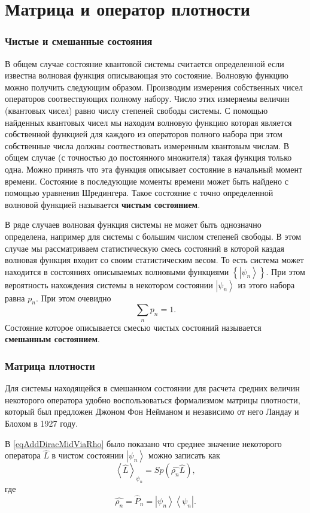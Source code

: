 \chapter{Матрица и оператор плотности}
\label{AddState}

\subsection{Чистые и смешанные состояния}
В общем случае состояние квантовой системы считается определенной если
известна волновая функция описывающая это состояние. Волновую функцию
можно получить следующим образом. Производим измерения собственных
чисел операторов соотвествующих полному набору. Число этих измеряемы
величин (квантовых чисел) равно числу степеней свободы системы. С
помощью найденных квантовых чисел мы находим волновую функцию которая
является собственной функцией для каждого из операторов полного набора
при этом собственные числа должны соотвествовать измеренным квантовым
числам. В общем случае (с точностью до постоянного множителя) такая
функция только одна. Можно принять что эта функция описывает состояние
в начальный момент времени. Состояние в последующие моменты времени
может быть найдено с помощью уравнения Шредингера. Такое состояние с
точно определенной волновой функцией называется 
\textbf{чистым состоянием}.

В ряде случаев волновая функция системы не может быть однозначно
определена, например для системы с большим числом степеней свободы. В
этом случае мы рассматриваем статистическую смесь состояний в которой
каздая волновая функция входит со своим статистическим весом. То есть
система может находится в состояниях описываемых волновыми функциями
\(\left\{\left|\psi_n\right>\right\}\). При этом вероятность
нахождения системы в некотором состоянии \(\left|\psi_n\right>\) из
этого набора равна \(p_n\). При этом очевидно 
\[
\sum_n p_n = 1.
\]
Состояние которое описывается смесью чистых состояний называется
\textbf{смешанным состоянием}.

\subsection{Матрица плотности}
Для системы находящейся в смешанном состоянии для расчета средних
величин некоторого оператора удобно воспользоваться формализмом
матрицы плотности, который  был предложен Джоном Фон Нейманом и
независимо от него Ландау и Блохом в 1927 году.

В \ref{eqAddDiracMidViaRho} было показано что среднее значение
некоторого оператора \(\hat{L}\) в чистом состоянии 
\(\left|\psi_n\right>\) можно записать как
\[
\left< \hat{L} \right>_{\psi_n} = Sp \left(\hat{\rho_n} \hat{L} \right),
\]
где
\[
\hat{\rho_n} = \hat{P}_n = \left|\psi_n\right>\left<\psi_n\right|.
\]

